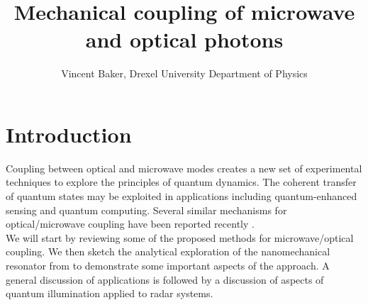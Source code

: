 \documentclass[a4paper,10pt,twocolumn]{article}
\title{Mechanical coupling of microwave and optical photons}
\author{Vincent Baker, Drexel University Department of Physics}
\numberwithin{equation}{section}
\begin{document}
\section{Introduction}
Coupling between optical and microwave modes creates a new set of experimental techniques to explore the principles of quantum dynamics.
The coherent transfer of quantum states may be exploited in applications including quantum-enhanced sensing and quantum computing.
Several similar mechanisms for optical/microwave coupling have been reported recently \cite{nanoCrystal, nanoMR}.\\
We will start by reviewing some of the proposed methods for microwave/optical coupling.
We then sketch the analytical exploration of the nanomechanical resonator from \cite{nanoMR} to demonstrate some important aspects of the approach. 
A general discussion of applications is followed by a discussion of aspects of quantum illumination applied to radar systems.
\end{document}
